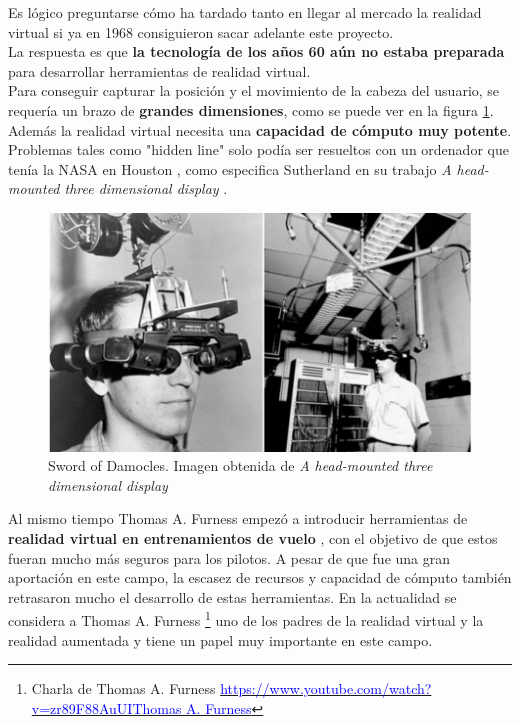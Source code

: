 \documentclass[twoside, 11pt]{epstfg}
\begin{document}
Es lógico preguntarse cómo ha tardado tanto en llegar al mercado la realidad virtual si ya en 1968 consiguieron sacar adelante este proyecto.\\
La respuesta es que \textbf{la tecnología de los años 60 aún no estaba preparada} para desarrollar herramientas de realidad virtual.\\
Para conseguir capturar la posición y el movimiento de la cabeza del usuario, se requería un brazo de \textbf{grandes dimensiones}, como se puede ver en la figura \ref{fig::SwordOfDamocles}.\\
Además la realidad virtual necesita una \textbf{capacidad de cómputo muy potente}. Problemas tales como "hidden line" solo podía ser resueltos con un ordenador que tenía la NASA en Houston \cite{hedgley1982general}, como especifica Sutherland en su trabajo \textit{A head-mounted three dimensional display} \cite{Sutherland}. 

\begin{figure}[H]
	\centerline{
		\mbox{\includegraphics[width=.80\textwidth]{images/SwordOfDamocles.jpg}}
	}
	\caption{Sword of Damocles. Imagen obtenida de \textit{A head-mounted three dimensional display} \cite{Sutherland}}
	\label{fig::SwordOfDamocles}
\end{figure}


Al mismo tiempo Thomas A. Furness empezó a introducir herramientas de \textbf{realidad virtual en entrenamientos de vuelo} \cite{kocian1977visually}, con el objetivo de que estos fueran mucho más seguros para los pilotos.
A pesar de que fue una gran aportación en este campo, la escasez de recursos y capacidad de cómputo también retrasaron mucho el desarrollo de estas herramientas. En la actualidad se considera a Thomas A. Furness \footnote{Charla de Thomas A. Furness \href{https://www.youtube.com/watch?v=zr89F88AuUI}{\textcolor{blue}{https://www.youtube.com/watch?v=zr89F88AuUI}{\textcolor{blue}{Thomas A. Furness}}}} uno de los padres de la realidad virtual y la realidad aumentada y tiene un papel muy importante en este campo. 
 
\end{document}
